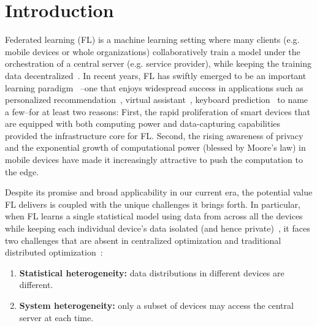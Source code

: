 

\section{Introduction}
Federated learning (FL) is a machine learning setting where many clients (e.g. mobile devices or whole organizations) collaboratively train a model under the orchestration of a central server (e.g. service provider), while keeping the training data decentralized~\cite{kairouz2019advances}.
In recent years, FL has swiftly emerged to be an important learning paradigm~\cite{mcmahan2016communication} --one that enjoys widespread success in applications such as personalized recommendation~\cite{chen2018federated}, virtual assistant~\cite{lamautonomy}, keyboard prediction~\cite{47586} to name a few--for at least two reasons: First, the rapid proliferation of smart devices that are equipped with both computing power and data-capturing capabilities provided the infrastructure core for FL. Second, the rising awareness of privacy and the exponential growth of computational power (blessed by Moore's law) in mobile devices have made it increasingly attractive to push the computation to the edge.

Despite its promise and broad applicability in our current era, the potential value FL delivers is coupled with the unique challenges it brings forth. In particular,
when FL learns a single statistical model using data from across all the devices while keeping each individual device's data isolated (and hence private)~\cite{kairouz2019advances}, it faces two challenges that are absent in centralized optimization and traditional distributed optimization~\cite{li2019convergence,smith2017federated}:
\begin{enumerate}
\item\textbf{Statistical heterogeneity:} data distributions in different devices are different.
\item\textbf{System heterogeneity:} only a subset of devices may access the central server at each time. 
\end{enumerate}

